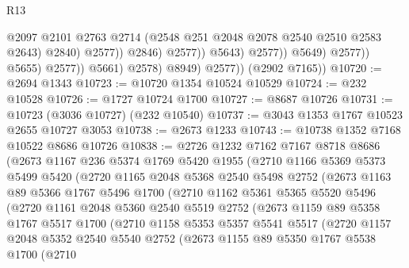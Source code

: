 \begin{lexlean}{R13}
\begin{coremodule}
                                              @2097
                                              @2101
                                              @2763
                                              @2714
                                              (@2548 @251 @2048 @2078 @2540 @2510 @2583 @2643)
                                              @2840)
                                            @2577))
                                        @2846)
                                      @2577))
                                  @5643)
                                @2577))
                            @5649)
                          @2577))
                      @5655)
                    @2577))
                @5661)
              @2578)
            @8949)
          @2577))
      (@2902 @7165))
@10720 := @2694 @1343
@10723 := @10720 @1354 @10524 @10529
@10724 := @232 @10528
@10726 := @1727 @10724 @1700
@10727 := @8687 @10726
@10731 := @10723 (@3036 @10727) (@232 @10540)
@10737 := @3043 @1353 @1767 @10523 @2655 @10727 @3053
@10738 := @2673 @1233
@10743 := @10738 @1352 @7168 @10522 @8686 @10726
@10838 := @2726
    @1232
    @7162
    @7167
    @8718
    @8686
    (@2673
      @1167
      @236
      @5374
      @1769
      @5420
      @1955
      (@2710
        @1166
        @5369
        @5373
        @5499
        @5420
        (@2720
          @1165
          @2048
          @5368
          @2540
          @5498
          @2752
          (@2673
            @1163
            @89
            @5366
            @1767
            @5496
            @1700
            (@2710
              @1162
              @5361
              @5365
              @5520
              @5496
              (@2720
                @1161
                @2048
                @5360
                @2540
                @5519
                @2752
                (@2673
                  @1159
                  @89
                  @5358
                  @1767
                  @5517
                  @1700
                  (@2710
                    @1158
                    @5353
                    @5357
                    @5541
                    @5517
                    (@2720
                      @1157
                      @2048
                      @5352
                      @2540
                      @5540
                      @2752
                      (@2673
                        @1155
                        @89
                        @5350
                        @1767
                        @5538
                        @1700
                        (@2710

\end{coremodule}
\end{lexlean}
